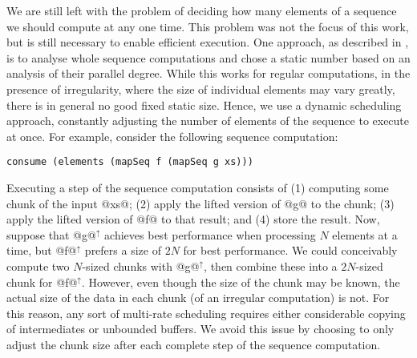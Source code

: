 We are still left with the problem of deciding how many elements of a sequence
we should compute at any one time. This problem was not the focus of this work, but is still necessary to enable efficient execution. One approach, as described in \citet{Madsen:2015}, is to analyse whole sequence computations and chose a static number based on an analysis of their parallel
degree. While this works for regular computations, in the presence of
irregularity, where the size of individual elements may vary greatly, there is
in general no good fixed static size. Hence, we use a dynamic scheduling
approach, constantly adjusting the number of elements of the sequence to execute
at once.
For example, consider the following sequence computation:
%
\begin{lstlisting}
consume (elements (mapSeq f (mapSeq g xs)))
\end{lstlisting}
%
Executing a step of the sequence computation consists of (1) computing some
chunk of the input @xs@; (2) apply the lifted version of @g@ to the chunk; (3) apply
the lifted version of @f@ to that result; and (4) store the result. Now, suppose
that @g@$^\uparrow$ achieves best performance when processing $N$ elements at a
time, but @f@$^\uparrow$ prefers a size of $2N$ for best performance. We could
conceivably compute two $N$-sized chunks with @g@$^\uparrow$, then combine these
into a $2N$-sized chunk for @f@$^\uparrow$. However, even though the size of the
chunk may be known, the actual size of the data in each chunk (of an irregular
computation) is not. For this reason, any sort of multi-rate scheduling requires
either considerable copying of intermediates or unbounded buffers. We avoid this
issue by choosing to only adjust the chunk size after each complete step of the
sequence computation.


